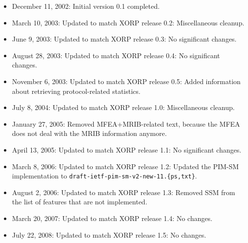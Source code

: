 \documentclass[11pt]{article}
\begin{document}
\begin{itemize}

  \item December 11, 2002: Initial version 0.1 completed.

  \item March 10, 2003: Updated to match XORP release 0.2:
   Miscellaneous cleanup.

  \item June 9, 2003: Updated to match XORP release 0.3:
   No significant changes.

  \item August 28, 2003: Updated to match XORP release 0.4:
   No significant changes.

  \item November 6, 2003: Updated to match XORP release 0.5:
   Added information about retrieving protocol-related statistics.

  \item July 8, 2004: Updated to match XORP release 1.0:
   Miscellaneous cleanup.

  \item January 27, 2005: Removed MFEA+MRIB-related text, because the MFEA
  does not deal with the MRIB information anymore.

  \item April 13, 2005: Updated to match XORP release 1.1:
   No significant changes.

  \item March 8, 2006: Updated to match XORP release 1.2:
   Updated the PIM-SM implementation to \newline
   \verb=draft-ietf-pim-sm-v2-new-11.{ps,txt}=.

  \item August 2, 2006: Updated to match XORP release 1.3:
   Removed SSM from the list of features that are not implemented.

  \item March 20, 2007: Updated to match XORP release 1.4:
   No changes.

  \item July 22, 2008: Updated to match XORP release 1.5:
   No changes.

\end{itemize}




\end{document}
